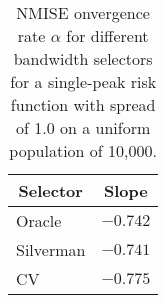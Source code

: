 \begin{table}[htbp]
\begin{center}
\begin{tabular}{lr}
\hline\hline
\multicolumn{1}{c}{Selector}&\multicolumn{1}{c}{Slope}\tabularnewline
\hline
Oracle&$-0.742$\tabularnewline
Silverman&$-0.741$\tabularnewline
CV&$-0.775$\tabularnewline
\hline
\end{tabular}
\caption[NMISE Convergence rate of bandwidth selectors]{NMISE onvergence rate $\alpha$ for different bandwidth selectors for a single-peak risk function with spread of 1.0 on a uniform population of 10,000.\label{tab:results:nmise_alpha_by_selector}}\end{center}
\end{table}
